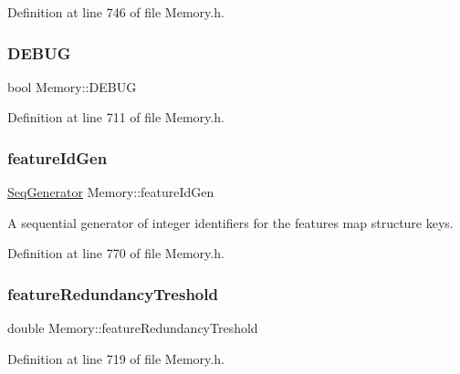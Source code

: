 Definition at line 746 of file Memory.\+h.

\mbox{\label{class_memory_a8607f19b7d9871eeb12ca94d7938c710}} 
\subsubsection{\texorpdfstring{D\+E\+B\+UG}{DEBUG}}
{\footnotesize\ttfamily bool Memory\+::\+D\+E\+B\+UG\hspace{0.3cm}{\ttfamily [protected]}}



Definition at line 711 of file Memory.\+h.

\mbox{\label{class_memory_a3c07af17879875325b9073fc77f56e3f}} 
\subsubsection{\texorpdfstring{feature\+Id\+Gen}{featureIdGen}}
{\footnotesize\ttfamily \hyperlink{class_seq_generator}{Seq\+Generator} Memory\+::feature\+Id\+Gen\hspace{0.3cm}{\ttfamily [protected]}}

A sequential generator of integer identifiers for the features map structure keys. 

Definition at line 770 of file Memory.\+h.

\mbox{\label{class_memory_a5b4e6c308dedb36e66bef5b85f5a1d1a}} 
\subsubsection{\texorpdfstring{feature\+Redundancy\+Treshold}{featureRedundancyTreshold}}
{\footnotesize\ttfamily double Memory\+::feature\+Redundancy\+Treshold\hspace{0.3cm}{\ttfamily [protected]}}



Definition at line 719 of file Memory.\+h.

\mbox{\label{class_memory_a70a3ffe94ecd25fa10c683b3fac6328b}} 
